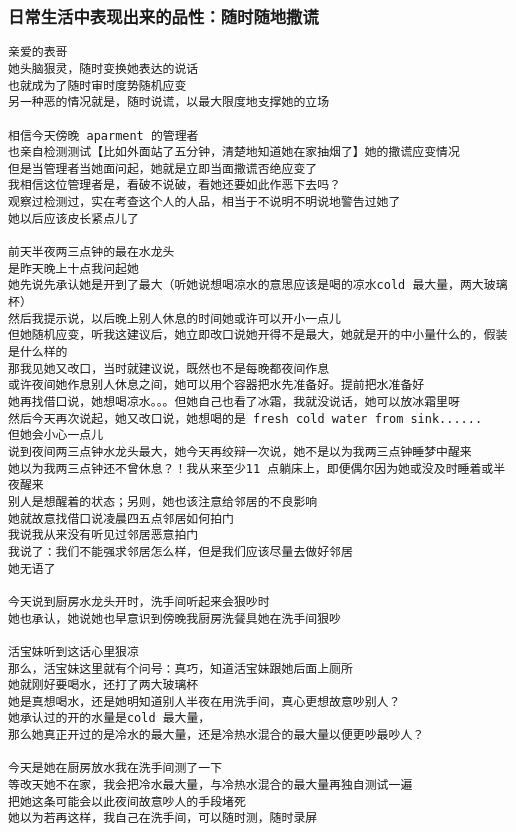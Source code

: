 \documentclass[9pt, b5paper]{article}
\begin{document}
\subsubsection{日常生活中表现出来的品性：随时随地撒谎}
\label{sec-3-2-4}
\begin{verbatim}
亲爱的表哥
她头脑狠灵，随时变换她表达的说话
也就成为了随时审时度势随机应变
另一种恶的情况就是，随时说谎，以最大限度地支撑她的立场

相信今天傍晚 aparment 的管理者
也亲自检测测试【比如外面站了五分钟，清楚地知道她在家抽烟了】她的撒谎应变情况
但是当管理者当她面问起，她就是立即当面撒谎否绝应变了
我相信这位管理者是，看破不说破，看她还要如此作恶下去吗？
观察过检测过，实在考查这个人的人品，相当于不说明不明说地警告过她了
她以后应该皮长紧点儿了

前天半夜两三点钟的最在水龙头
是昨天晚上十点我问起她
她先说先承认她是开到了最大（听她说想喝凉水的意思应该是喝的凉水cold 最大量，两大玻璃杯）
然后我提示说，以后晚上别人休息的时间她或许可以开小一点儿
但她随机应变，听我这建议后，她立即改口说她开得不是最大，她就是开的中小量什么的，假装是什么样的
那我见她又改口，当时就建议说，既然也不是每晚都夜间作息
或许夜间她作息别人休息之间，她可以用个容器把水先准备好。提前把水准备好
她再找借口说，她想喝凉水。。。但她自己也看了冰霜，我就没说话，她可以放冰霜里呀
然后今天再次说起，她又改口说，她想喝的是 fresh cold water from sink......
但她会小心一点儿
说到夜间两三点钟水龙头最大，她今天再绞辩一次说，她不是以为我两三点钟睡梦中醒来
她以为我两三点钟还不曾休息？！我从来至少11 点躺床上，即便偶尔因为她或没及时睡着或半夜醒来
别人是想醒着的状态；另则，她也该注意给邻居的不良影响
她就故意找借口说凌晨四五点邻居如何拍门
我说我从来没有听见过邻居恶意拍门
我说了：我们不能强求邻居怎么样，但是我们应该尽量去做好邻居 
她无语了

今天说到厨房水龙头开时，洗手间听起来会狠吵时
她也承认，她说她也早意识到傍晚我厨房洗餐具她在洗手间狠吵

活宝妹听到这话心里狠凉 
那么，活宝妹这里就有个问号：真巧，知道活宝妹跟她后面上厕所
她就刚好要喝水，还打了两大玻璃杯
她是真想喝水，还是她明知道别人半夜在用洗手间，真心更想故意吵别人？
她承认过的开的水量是cold 最大量，
那么她真正开过的是冷水的最大量，还是冷热水混合的最大量以便更吵最吵人？

今天是她在厨房放水我在洗手间测了一下
等改天她不在家，我会把冷水最大量，与冷热水混合的最大量再独自测试一遍
把她这条可能会以此夜间故意吵人的手段堵死
她以为若再这样，我自己在洗手间，可以随时测，随时录屏
\end{verbatim}
\end{document}
